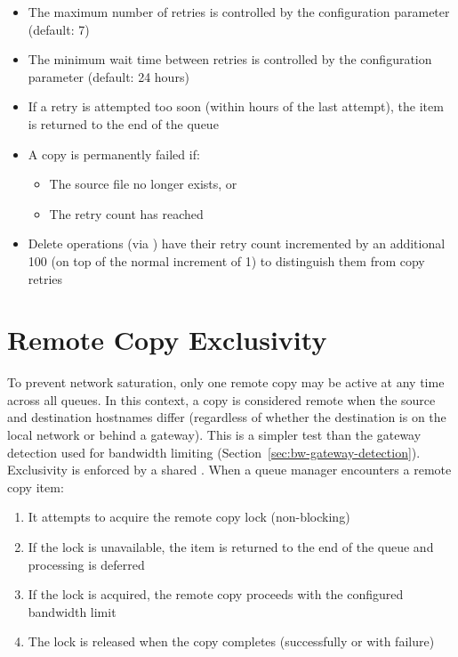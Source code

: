 \begin{itemize}
    \item The maximum number of retries is controlled by the  configuration parameter (default: 7)
    \item The minimum wait time between retries is controlled by the  configuration parameter (default: 24 hours)
    \item If a retry is attempted too soon (within  hours of the last attempt), the item is returned to the end of the queue
    \item A copy is permanently failed if:
    \begin{itemize}
        \item The source file no longer exists, or
        \item The retry count has reached 
    \end{itemize}
    \item Delete operations (via ) have their retry count incremented by an additional 100 (on top of the normal increment of 1) to distinguish them from copy retries
\end{itemize}

\section{Remote Copy Exclusivity}
\label{sec:remote-exclusivity}

To prevent network saturation, only one remote copy may be active at any time across all \DR{} queues. In this context, a copy is considered remote when the source and destination hostnames differ (regardless of whether the destination is on the local network or behind a gateway). This is a simpler test than the gateway detection used for bandwidth limiting (Section~\ref{sec:bw-gateway-detection}). Exclusivity is enforced by a shared . When a \DR{} queue manager encounters a remote copy item:

\begin{enumerate}
    \item It attempts to acquire the remote copy lock (non-blocking)
    \item If the lock is unavailable, the item is returned to the end of the queue and processing is deferred
    \item If the lock is acquired, the remote copy proceeds with the configured bandwidth limit
    \item The lock is released when the copy completes (successfully or with failure)
\end{enumerate}

